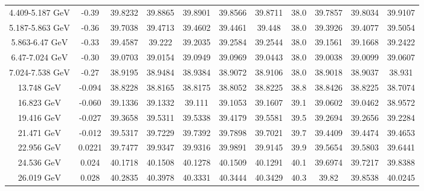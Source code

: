 \documentclass[11pt]{article}
\begin{document}
\begin{table}[htbp]
{\begin{tabular}{ccccccccccc}
				4.409-5.187 ${\textrm{GeV}}$ & -0.39  & 39.8232 & 39.8865 & 39.8901 & 39.8566 & 39.8711 & 38.0  & 39.7857 & 39.8034 & 39.9107 \\
				5.187-5.863 ${\textrm{GeV}}$ & -0.36  & 39.7038 & 39.4713 & 39.4602 & 39.4461 & 39.448 & 38.0  & 39.3926 & 39.4077 & 39.5054 \\
				5.863-6.47 ${\textrm{GeV}}$ & -0.33  & 39.4587 & 39.222 & 39.2035 & 39.2584 & 39.2544 & 38.0  & 39.1561 & 39.1668 & 39.2422 \\
				6.47-7.024 ${\textrm{GeV}}$ & -0.30  & 39.0703 & 39.0154 & 39.0949 & 39.0969 & 39.0443 & 38.0  & 39.0038 & 39.0099 & 39.0607 \\
				7.024-7.538 ${\textrm{GeV}}$ & -0.27  & 38.9195 & 38.9484 & 38.9384 & 38.9072 & 38.9106 & 38.0  & 38.9018 & 38.9037 & 38.931 \\
				\midrule
				13.748 ${\textrm{GeV}}$ & -0.094 & 38.8228 & 38.8165 & 38.8175 & 38.8052 & 38.8225 & 38.8  & 38.8426 & 38.8225 & 38.7074 \\
				16.823 ${\textrm{GeV}}$ & -0.060 & 39.1336 & 39.1332 & 39.111 & 39.1053 & 39.1607 & 39.1  & 39.0602 & 39.0462 & 38.9572 \\
				19.416 ${\textrm{GeV}}$ & -0.027 & 39.3658 & 39.5311 & 39.5338 & 39.4179 & 39.5581 & 39.5  & 39.2694 & 39.2656 & 39.2284 \\
				21.471 ${\textrm{GeV}}$ & -0.012 & 39.5317 & 39.7229 & 39.7392 & 39.7898 & 39.7021 & 39.7  & 39.4409 & 39.4474 & 39.4653 \\
				22.956 ${\textrm{GeV}}$ & 0.0221 & 39.7477 & 39.9347 & 39.9316 & 39.9891 & 39.9145 & 39.9  & 39.5654 & 39.5803 & 39.6441 \\
				24.536 ${\textrm{GeV}}$ & 0.024 & 40.1718 & 40.1508 & 40.1278 & 40.1509 & 40.1291 & 40.1  & 39.6974 & 39.7217 & 39.8388 \\
				26.019 ${\textrm{GeV}}$ & 0.028 & 40.2835 & 40.3978 & 40.3331 & 40.3444 & 40.3429 & 40.3  & 39.82 & 39.8538 & 40.0245 \\
				\bottomrule
				\bottomrule
			\end{tabular}
}
\end{table}
\end{document}
